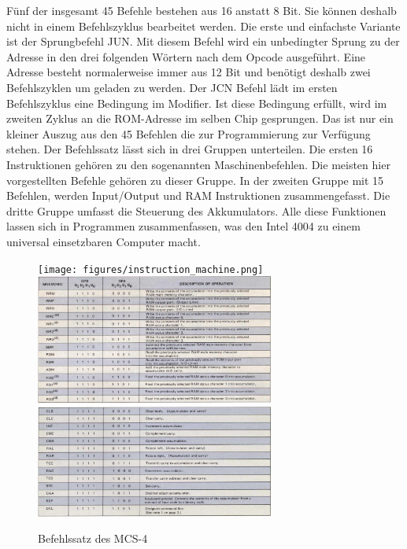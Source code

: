 Fünf der insgesamt 45 Befehle bestehen aus 16 anstatt 8 Bit. Sie können deshalb nicht in einem Befehlszyklus bearbeitet werden. Die erste und einfachste Variante ist der Sprungbefehl JUN. Mit diesem Befehl wird ein unbedingter Sprung zu der Adresse in den drei folgenden Wörtern nach dem Opcode ausgeführt. Eine Adresse besteht normalerweise immer aus 12 Bit und benötigt deshalb zwei Befehlszyklen um geladen zu werden. Der JCN Befehl lädt im ersten Befehlszyklus eine Bedingung im Modifier. Ist diese Bedingung erfüllt, wird im zweiten Zyklus an die ROM-Adresse im selben Chip gesprungen. Das ist nur ein kleiner Auszug aus den 45 Befehlen die zur Programmierung zur Verfügung stehen. Der Befehlssatz lässt sich in drei Gruppen unterteilen. Die ersten 16 Instruktionen gehören zu den sogenannten Maschinenbefehlen. Die meisten hier vorgestellten Befehle gehören zu dieser Gruppe. In der zweiten Gruppe mit 15 Befehlen, werden Input/Output und RAM Instruktionen zusammengefasst. Die dritte Gruppe umfasst die Steuerung des Akkumulators. Alle diese Funktionen lassen sich in Programmen zusammenfassen, was den Intel 4004 zu einem universal einsetzbaren Computer macht.
 \begin{figure}[ht]
 	\centering
 	\texttt{[image: figures/instruction\_machine.png]}
 	 \includegraphics[width=0.7\textwidth]{figures/instruction_ram.png} 	\includegraphics[width=0.7\textwidth]{figures/instruction_accum.png}
 	\caption{Befehlssatz des MCS-4}
 	\label{fig:cycle}
 \end{figure}